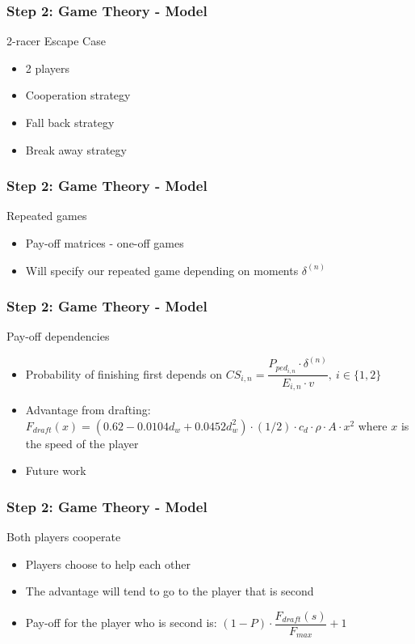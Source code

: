 \documentclass{beamer}
\begin{document}
\begin{frame}
\frametitle{Step 2: Game Theory - Model}
\begin{block}{2-racer Escape Case}
	\begin{itemize}
		\item 2 players
		\item Cooperation strategy
		\item Fall back strategy
		\item Break away strategy
	\end{itemize}
\end{block}
\end{frame}

\begin{frame}
\frametitle{Step 2: Game Theory - Model}
\begin{block}{Repeated games}
	\begin{itemize}
		\item Pay-off matrices - one-off games
		\item Will specify our repeated game depending on moments $\delta^{(n)}$
	\end{itemize}
\end{block}
\end{frame}

\begin{frame}
\frametitle{Step 2: Game Theory - Model}
\begin{block}{Pay-off dependencies}
	\begin{itemize}
		\item Probability of finishing first depends on $CS_{i,n} = \dfrac{P_{ped_{i,n}} \cdot \delta^{(n)}}{E_{i,n} \cdot v},\ i\in\{1,2\}$
		\item Advantage from drafting: $F_{draft}(x) = (0.62 - 0.0104 d_w + 0.0452 d_w^2)\cdot (1/2)\cdot c_d\cdot \rho\cdot A\cdot x^2$ where $x$ is the speed of the player
		\item Future work
	\end{itemize}
\end{block}
\end{frame}

\begin{frame}
\frametitle{Step 2: Game Theory - Model}
\begin{block}{Both players cooperate}
	\begin{itemize}
		\item Players choose to help each other
		\item The advantage will tend to go to the player that is second
		\item Pay-off for the player who is second is: $(1-P)\cdot \dfrac{F_{draft}(s)}{F_{max}} + 1$
	\end{itemize}
\end{block}
\end{frame}
\end{document}
